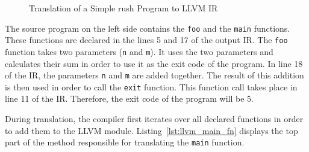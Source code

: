 \noindent
\begin{figure}[h]
	\begin{minipage}{.5\textwidth}
		\centering
	\end{minipage}%
	\begin{minipage}{.5\textwidth}
		\centering
	\end{minipage}
	\caption{Translation of a Simple rush Program to LLVM IR}
	\label{fig:llvm_simple}
\end{figure}

The source program on the left side contains the \texttt{foo} and the \texttt{main} functions.
These functions are declared in the lines 5 and 17 of the output IR.
The \texttt{foo} function takes two parameters (\texttt{n} and \texttt{m}).
It uses the two parameters and calculates their sum in order to use it as the exit code of the program.
In line 18 of the IR, the parameters \texttt{n} and \texttt{m} are added together.
The result of this addition is then used in order to call the \texttt{exit} function.
This function call takes place in line 11 of the IR.
Therefore, the exit code of the program will be 5.

During translation, the compiler first iterates over all declared functions in order to add them to the LLVM module.
Listing~\ref{lst:llvm_main_fn} displays the top part of the method responsible for translating the \texttt{main} function.


